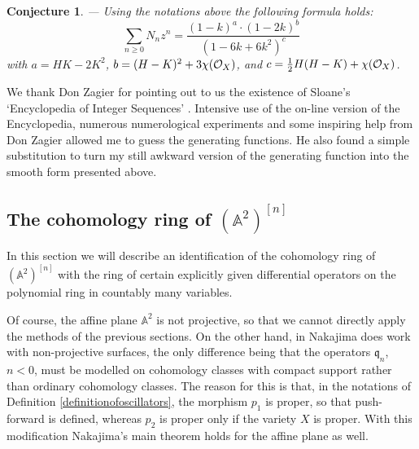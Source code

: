 \documentclass[twoside,11pt]{article}
\newtheorem{conjecture}[theorem]{Conjecture}
\newcommand{\ko}{{\cal O}}
\newcommand{\IA}{{\mathbb A}}
\newcommand{\gothq}{{\mathfrak q}}
\newcommand{\qq}{\gothq}
\begin{document}
\begin{conjecture}--- Using the notations above the following formula holds:
$$\sum_{n\geq0}N_nz^n=\frac{(1-k)^a\cdot(1-2k)^b}{(1-6k+6k^2)^{c}}$$
with $a={HK-2K^2}$, $b={(H-K)^2+3\chi(\ko_X)}$, and
$c=\frac{1}{2}H(H-K)+\chi(\ko_X)$.
\end{conjecture}


We thank Don Zagier for pointing out to us the existence of Sloane's `Encyclopedia of Integer Sequences' \cite{Sloane}. Intensive use of the 
on-line version of the Encyclopedia, numerous numerological experiments
and some inspiring help from Don Zagier allowed me to guess the 
generating functions. He also found a simple substitution to turn my still
awkward version of the generating function into the smooth form presented
above. 



\subsection{The cohomology ring of $(\IA^2)^{[n]}$}


In this section we will describe an identification of the cohomology ring of
$(\IA^2)^{[n]}$ with the ring of certain explicitly given differential operators
on the polynomial ring in countably many variables. 

Of course, the affine plane $\IA^2$ is
not projective, so that we cannot directly apply the methods of the previous
sections. On the other hand, in \cite{Nakajima} Nakajima does work with 
non-projective surfaces, the only difference being that the operators $\qq_n$,
$n<0$, must be modelled on cohomology classes with compact support rather than
ordinary cohomology classes. The reason for this is that, in the notations of
Definition \ref{definitionofoscillators}, the morphism $p_1$ is proper, so that
push-forward is defined, whereas $p_2$ is proper only if the variety $X$ is
proper. With this modification Nakajima's main theorem holds for the affine plane as well.
\end{document}

